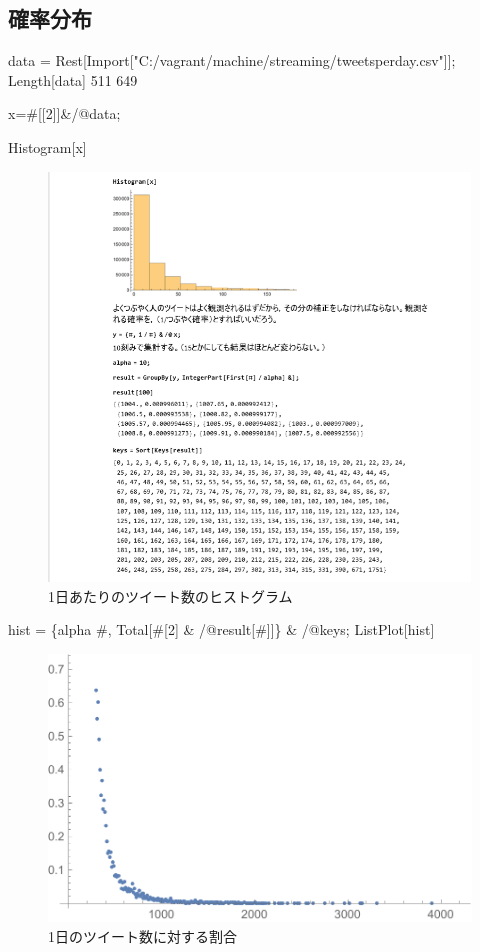 \subsection{確率分布}

data = Rest[Import["C:/vagrant/machine/streaming/tweetsperday.csv"]]; 
Length[data]
511 649

x=\#[[2]]\&/@data;

Histogram[x]

\begin{figure}[htb]
\centering
\includegraphics[width=13cm]{hisu1.png}
\caption{1日あたりのツイート数のヒストグラム}\label{ヒストグラム}
\end{figure}
\newpage

hist = \{alpha \#, Total[\#[2] \& /@result[\#]]\} \& /@keys;
ListPlot[hist]

\begin{figure}[htb]
\centering
\includegraphics[width=13cm]{tweets.pdf}
\caption{1日のツイート数に対する割合}\label{ツイートの分布}
\end{figure}

